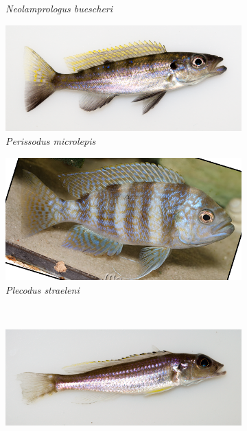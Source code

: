 \begin{figure}
\begin{subfigure}[t]{\fishfigwidth}
        \caption{\textit{Neolamprologus buescheri}}
    \end{subfigure}
    \begin{subfigure}[t]{\fishfigwidth}
        \includegraphics[width=\fishfigwidth]{FishPoo/figures/host_phenotypes/Perissodus_microlepis}
        \small
        \caption{\textit{Perissodus microlepis}}
    \end{subfigure}
    \begin{subfigure}[t]{\fishfigwidth}
        \includegraphics[width=\fishfigwidth]{FishPoo/figures/host_phenotypes/Plecodus_straeleni}
        \small
        \caption{\textit{Plecodus straeleni}} 
    \end{subfigure} \\
    \begin{subfigure}[t]{\fishfigwidth}
        \includegraphics[width=\fishfigwidth]{FishPoo/figures/host_phenotypes/Reganochromis_calliurus}

\end{subfigure}
\end{figure}
